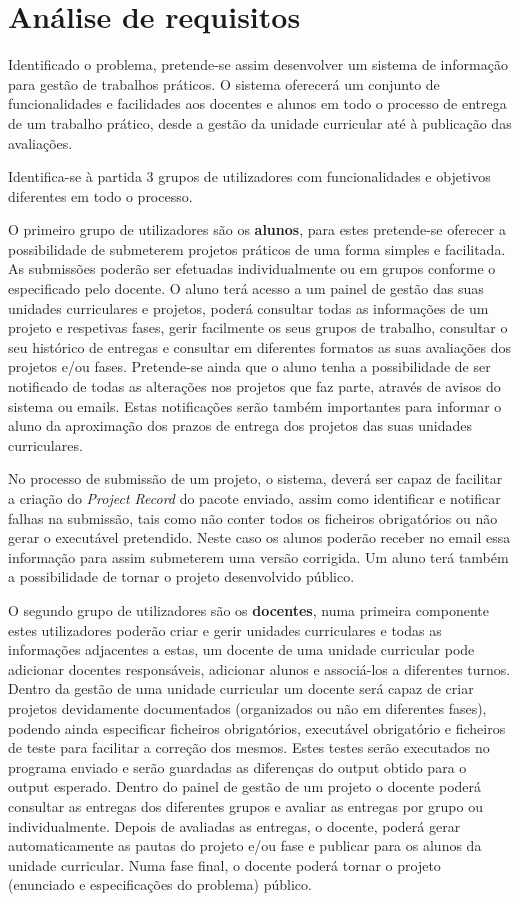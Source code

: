 \section{Análise de requisitos}

Identificado o problema, pretende-se assim desenvolver um sistema de informação para gestão de trabalhos práticos. O sistema oferecerá um conjunto de funcionalidades e facilidades aos docentes e alunos em todo o processo de entrega de um trabalho prático, desde a gestão da unidade curricular até à publicação das avaliações.

Identifica-se à partida 3 grupos de utilizadores com funcionalidades e objetivos diferentes em todo o processo.

O primeiro grupo de utilizadores são os \textbf{alunos}, para estes pretende-se oferecer a possibilidade de submeterem projetos práticos de uma forma simples e facilitada. As submissões poderão ser efetuadas individualmente ou em grupos conforme o especificado pelo docente. O aluno terá acesso a um painel de gestão das suas unidades curriculares e projetos, poderá consultar todas as informações de um projeto e respetivas fases, gerir facilmente os seus grupos de trabalho, consultar o seu histórico de entregas e consultar em diferentes formatos as suas avaliações dos projetos e/ou fases. Pretende-se ainda que o aluno tenha a possibilidade de ser notificado de todas as alterações nos projetos que faz parte, através de avisos do sistema ou emails. Estas notificações serão também importantes para informar o aluno da aproximação dos prazos de entrega dos projetos das suas unidades curriculares.

No processo de submissão de um projeto, o sistema, deverá ser capaz de facilitar a criação do \textit{Project Record} do pacote enviado, assim como identificar e notificar falhas na submissão, tais como não conter todos os ficheiros obrigatórios ou não gerar o executável pretendido. Neste caso os alunos poderão receber no email essa informação para assim submeterem uma versão corrigida.
Um aluno terá também a possibilidade de tornar o projeto desenvolvido público.

O segundo grupo de utilizadores são os \textbf{docentes}, numa primeira componente estes utilizadores poderão criar e gerir unidades curriculares e todas as informações adjacentes a estas, um docente de uma unidade curricular pode adicionar docentes responsáveis, adicionar alunos e associá­-los a diferentes turnos. Dentro da gestão de uma unidade curricular um docente será capaz de criar projetos devidamente documentados (organizados ou não em diferentes fases), podendo ainda especificar ficheiros obrigatórios, executável obrigatório e ficheiros de teste para facilitar a correção dos mesmos. Estes testes serão executados no programa enviado e serão guardadas as diferenças do output obtido para o output esperado. Dentro do painel de gestão de um projeto o docente poderá consultar as entregas dos diferentes grupos e avaliar as entregas por grupo ou individualmente. Depois de avaliadas as entregas, o docente, poderá gerar automaticamente as pautas do projeto e/ou fase e publicar para os alunos da unidade curricular.
Numa fase final, o docente poderá tornar o projeto (enunciado e especificações do problema) público.

